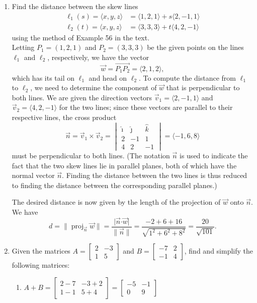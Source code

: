 \documentclass[12pt]{article}
\newcommand{\abs}[1]{\lvert #1\rvert}
\newcommand{\len}[1]{\lVert #1\rVert}
\newcommand{\dotp}{\boldsymbol{\cdot}}
\newcommand{\bbm}{\begin{bmatrix}}
\newcommand{\ebm}{\end{bmatrix}}
\begin{document}
\thispagestyle{fancy}
 \begin{enumerate}
 
\item Find the distance between the skew lines 
\begin{align*}
 \ell_1(s) = \langle x,y,z\rangle & = \langle 1,2,1\rangle+s\langle 2,-1,1\rangle\\
 \ell_2(t) = \langle x,y,z\rangle & = \langle 3,3,3\rangle+t\langle 4,2,-1\rangle
\end{align*}
using the method of Example 56 in the text. \\

Letting $P_1 = (1,2,1)$ and $P_2=(3,3,3)$ be the given points on the lines $\ell_1$ and $\ell_2$, respectively, we have the vector 
\[
 \vec{w} = \overrightarrow{P_1P_2} = \langle 2,1,2\rangle,
\]
which has its tail on $\ell_1$ and head on $\ell_2$. To compute the distance from $\ell_1$ to $\ell_2$, we need to determine the component of $\vec{w}$ that is perpendicular to both lines. We are given the direction vectors $\vec{v}_1 = \langle 2,-1,1\rangle$ and $\vec{v}_2 = \langle 4,2,-1\rangle$ for the two lines; since these vectors are parallel to their respective lines, the cross product
\[
 \vec{n} = \vec{v}_1\times\vec{v}_2 = \begin{vmatrix}\hat{\imath}&\hat{\jmath}&\hat{k}\\2&-1&1\\4&2&-1\end{vmatrix} = \langle -1, 6, 8\rangle
\]
must be perpendicular to both lines. (The notation $\vec{n}$ is used to indicate the fact that the two skew lines lie in parallel planes, both of which have the normal vector $\vec{n}$. Finding the distance between the two lines is thus reduced to finding the distance between the corresponding parallel planes.)

The desired distance is now given by the length of the projection of $\vec{w}$ onto $\vec{n}$. We have
\[
 d = \len{\operatorname{proj}_{\vec{n}}\vec{w}} = \frac{\abs{\vec{n}\dotp\vec{w}}}{\len{\vec{n}}} = \frac{-2+6+16}{\sqrt{1^2+6^2+8^2}} = \frac{20}{\sqrt{101}}.
\]


\item Given the matrices $A = \bbm 2&-3\\1&5\ebm$ and $B = \bbm -7 & 2\\-1&4\ebm$, find and simplify the following matrices:
\begin{enumerate}
 \item $A+B = \bbm 2-7&-3+2\\1-1&5+4\ebm = \bbm -5&-1\\0&9\ebm$


\end{enumerate}
\end{enumerate}
\end{document}
